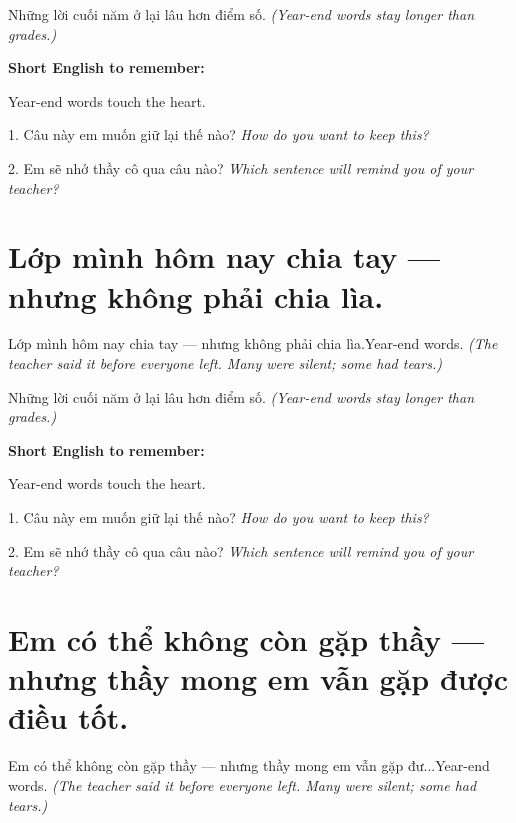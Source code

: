 \begin{baihoc}
Những lời cuối năm ở lại lâu hơn điểm số.
\textit{(Year-end words stay longer than grades.)}
\end{baihoc}

\begin{ghinhoanh}
\textbf{Short English to remember:}

Year-end words touch the heart.

\end{ghinhoanh}

\begin{tuhocnhanh}
1. Câu này em muốn giữ lại thế nào? \textit{How do you want to keep this?}

2. Em sẽ nhớ thầy cô qua câu nào? \textit{Which sentence will remind you of your teacher?}
\end{tuhocnhanh}
\ngancach


\section{Lớp mình hôm nay chia tay — nhưng không phải chia lìa.}
\begin{truyen}{Lớp mình hôm nay chia tay — nhưng không phải chia lìa.}{Year-end words.}
\textit{(The teacher said it before everyone left. Many were silent; some had tears.)}
\end{truyen}

\begin{baihoc}
Những lời cuối năm ở lại lâu hơn điểm số.
\textit{(Year-end words stay longer than grades.)}
\end{baihoc}

\begin{ghinhoanh}
\textbf{Short English to remember:}

Year-end words touch the heart.

\end{ghinhoanh}

\begin{tuhocnhanh}
1. Câu này em muốn giữ lại thế nào? \textit{How do you want to keep this?}

2. Em sẽ nhớ thầy cô qua câu nào? \textit{Which sentence will remind you of your teacher?}
\end{tuhocnhanh}
\ngancach


\section{Em có thể không còn gặp thầy — nhưng thầy mong em vẫn gặp được điều tốt.}
\begin{truyen}{Em có thể không còn gặp thầy — nhưng thầy mong em vẫn gặp đư...}{Year-end words.}
\textit{(The teacher said it before everyone left. Many were silent; some had tears.)}
\end{truyen}

